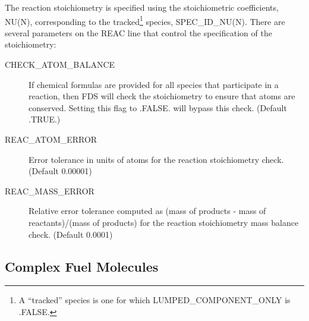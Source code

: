 \documentclass[11pt]{book}
\begin{document}
\noindent
The reaction stoichiometry is specified using the stoichiometric coefficients, {\ct NU(N)}, corresponding to the tracked\footnote{A ``tracked'' species is one for which {\ct LUMPED\_COMPONENT\_ONLY} is {\ct .FALSE.}} species, {\ct SPEC\_ID\_NU(N)}. There are several parameters on the {\ct REAC} line that control the specification of the stoichiometry:
\begin{description}
\item[{\ct CHECK\_ATOM\_BALANCE}] If chemical formulas are provided for all species that participate in a reaction, then FDS will check the stoichiometry to ensure that atoms are conserved.  Setting this flag to {\ct .FALSE.} will bypass this check.  (Default {\ct .TRUE.})
\item[{\ct REAC\_ATOM\_ERROR}] Error tolerance in units of atoms for the reaction stoichiometry check.  (Default 0.00001)
\item[{\ct REAC\_MASS\_ERROR}] Relative error tolerance computed as (mass of products - mass of reactants)/(mass of products) for the reaction stoichiometry mass balance check.  (Default 0.0001)
\end{description}



\subsection{Complex Fuel Molecules}

\label{info:Complex_Fuel}
\end{document}
